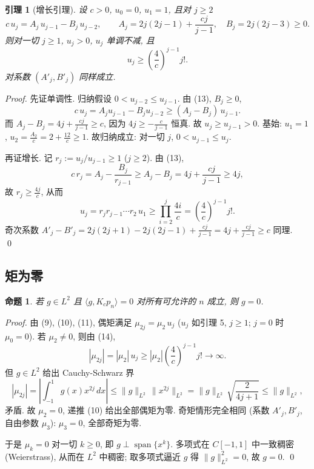 \documentclass[UTF8]{ctexart}
\newtheorem{proposition}[theorem]{命题}
\newtheorem{lemma}[theorem]{引理}
\begin{document}
\begin{lemma}[增长引理]
设 $c > 0$, $u_0 = 0$, $u_1 = 1$, 且对 $j \geq 2$
\begin{equation}
	c\, u_j = A_j\, u_{j-1} - B_j\, u_{j-2},
	\qquad
	A_j = 2j(2j-1) + \frac{cj}{j-1}, \quad B_j = 2j(2j-3) \geq 0 .
\end{equation}
则对一切 $j \geq 1$, $u_j > 0$, $u_j$ 单调不减, 且
\begin{equation}
	u_j \geq \left( \frac{4}{c} \right)^{j-1} j! .
\end{equation}
对系数 $(A'_j, B'_j)$ 同样成立.
\end{lemma}

\begin{proof}
先证单调性. 归纳假设 $0 < u_{j-2} \leq u_{j-1}$. 由 (13), $B_j \geq 0$,
\begin{equation}
	c\, u_j = A_j u_{j-1} - B_j u_{j-2}
	\geq (A_j - B_j)\, u_{j-1}.
\end{equation}
而 $A_j - B_j = 4j + \frac{cj}{j-1} \geq c$, 因为
$4j \geq -\tfrac{c}{j-1}$ 恒真. 故 $u_j \geq u_{j-1} > 0$.
基始: $u_1 = 1$, $u_2 = \tfrac{A_2}{c} = 2 + \tfrac{12}{c} \geq 1$.
故归纳成立: 对一切 $j$, $0 < u_{j-1} \leq u_j$.

再证增长. 记 $r_j := u_j / u_{j-1} \geq 1$ ($j \geq 2$). 由 (13),
\[
	c\, r_j = A_j - \frac{B_j}{r_{j-1}} \geq A_j - B_j
	= 4j + \frac{cj}{j-1} \geq 4j,
\]
故 $r_j \geq \tfrac{4j}{c}$, 从而
\[
	u_j = r_j r_{j-1} \cdots r_2\, u_1
	\geq \prod_{i=2}^{j} \frac{4i}{c}
	= \left( \frac{4}{c} \right)^{j-1} j! .
\]
奇次系数 $A'_j - B'_j = 2j(2j+1) - 2j(2j-1) + \frac{cj}{j-1}
= 4j + \frac{cj}{j-1} \geq c$ 同理. \qed
\end{proof}

\subsection{矩为零}

\begin{proposition}
若 $g \in L^2$ 且 $\langle g, K_c p_n \rangle = 0$ 对所有可允许的 $n$ 成立,
则 $g = 0$.
\end{proposition}

\begin{proof}
由 (9), (10), (11), 偶矩满足 $\mu_{2j} = \mu_2\, u_j$ ($u_j$ 如引理 5, $j \geq 1$;
$j = 0$ 时 $\mu_0 = 0$). 若 $\mu_2 \neq 0$, 则由 (14),
\[
	|\mu_{2j}| = |\mu_2|\, u_j \geq |\mu_2| \left( \frac{4}{c} \right)^{j-1} j! \to \infty .
\]
但 $g \in L^2$ 给出 Cauchy-Schwarz 界
\[
	|\mu_{2j}| = \left| \int_{-1}^{1} g(x) x^{2j}\, dx \right|
	\leq \|g\|_{L^2}\, \|x^{2j}\|_{L^2}
	= \|g\|_{L^2}\, \sqrt{\frac{2}{4j+1}} \leq \|g\|_{L^2},
\]
矛盾. 故 $\mu_2 = 0$, 递推 (10) 给出全部偶矩为零. 奇矩情形完全相同
(系数 $A'_j, B'_j$, 自由参数 $\mu_3$): $\mu_3 = 0$, 全部奇矩为零.

于是 $\mu_k = 0$ 对一切 $k \geq 0$, 即 $g \perp \operatorname{span}\{ x^k \}$.
多项式在 $C[-1,1]$ 中一致稠密 (Weierstrass), 从而在 $L^2$ 中稠密;
取多项式逼近 $g$ 得 $\|g\|_{L^2}^2 = 0$, 故 $g = 0$. \qed
\end{proof}
\end{document}
